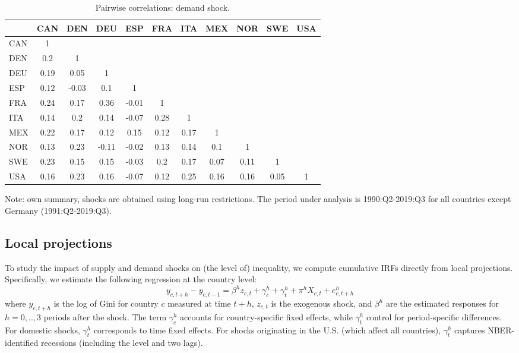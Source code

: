 \documentclass[12pt, a4paper]{article}
\begin{document}
\begin{table}[H]
\captionsetup{justification=raggedright,
singlelinecheck=false
}
    \centering
    \caption{Pairwise correlations: demand shock.}
    \begin{tabular}{l ccc ccc ccc c}
    \toprule
& CAN & DEN & DEU & ESP & FRA & ITA & MEX & NOR & SWE & USA \\ 
  \hline
  CAN & 1 &  &  &  &  &  &  &  &  &  \\ 
  DEN & 0.2 & 1 &  &  &  &  &  &  &  &  \\ 
  DEU & 0.19 & 0.05 & 1 &  &  &  &  &  &  &  \\ 
  ESP & 0.12 & -0.03 & 0.1 & 1 &  &  &  &  &  &  \\ 
  FRA & 0.24 & 0.17 & 0.36 & -0.01 & 1 &  &  &  &  &  \\ 
  ITA & 0.14 & 0.2 & 0.14 & -0.07 & 0.28 & 1 &  &  &  &  \\ 
  MEX & 0.22 & 0.17 & 0.12 & 0.15 & 0.12 & 0.17 & 1 &  &  &  \\ 
  NOR & 0.13 & 0.23 & -0.11 & -0.02 & 0.13 & 0.14 & 0.1 & 1 &  &  \\ 
  SWE & 0.23 & 0.15 & 0.15 & -0.03 & 0.2 & 0.17 & 0.07 & 0.11 & 1 &  \\ 
  USA & 0.16 & 0.23 & 0.16 & -0.07 & 0.12 & 0.25 & 0.16 & 0.16 & 0.05 & 1 \\ 
    \bottomrule
    \end{tabular}
    \begin{minipage}{\textwidth}
    \vspace{0.1cm}
    \footnotesize Note: own summary, shocks are obtained using long-run restrictions. The period under analysis is 1990:Q2-2019:Q3 for all countries except Germany (1991:Q2-2019:Q3).
    \end{minipage}
    \label{table:a3}
\end{table}


\subsection{Local projections} 
To study the impact of supply and demand shocks on (the level of) inequality, we compute cumulative IRFs directly from local projections. Specifically, we estimate the following regression at the country level:
\begin{equation}
    y_{c,t+h}-y_{c,t-1} =  \beta^h z_{c,t} + \gamma^h_c + \gamma^h_t + \pi^h X_{c,t} + e^h_{c, t+h}
\label{eq:1}
\end{equation}
\noindent where $y_{c,t+h}$ is the log of Gini for country $c$ measured at time $t+h$, $z_{c,t}$ is the exogenous shock, and $\beta^h$ are the estimated responses for $h = 0,..,3$ periods after the shock. The term $\gamma^h_c$ accounts for country-specific fixed effects, while $\gamma^h_t$ control for period-specific differences. For domestic shocks, $\gamma^h_t$ corresponds to time fixed effects. For shocks originating in the U.S. (which affect all countries), $\gamma^h_t$ captures NBER-identified recessions (including the level and two lags).
\end{document}
